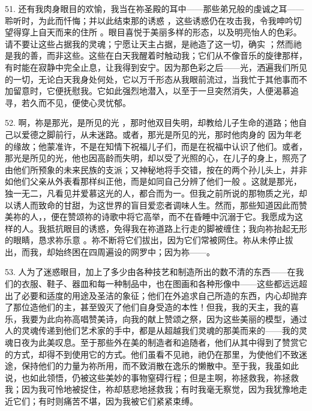 51. 还有我肉身眼目的欢愉，我当在祢圣殿的耳中——那些弟兄般的虔诚之耳——聆听时，为此而忏悔；并以此结束那的诱惑 ，这些诱惑仍在攻击我，令我呻吟切望得穿上自天而来的住所 。眼目喜悦于美丽多样的形态，以及明亮怡人的色彩。请不要让这些占据我的灵魂；宁愿让天主占据，是祂造了这一切，确实 ；然而祂是我的善，而非这些。这些在白天我醒着时触动我；它们从不像音乐的旋律那样，有时能在寂静中完全止息，让我得到安宁。因为那色彩之后——光，洒遍我们所见的一切，无论白天我身处何处，它以万千形态从我眼前流过，当我忙于其他事而不加留意时，它便抚慰我。它如此强烈地潜入，以至于一旦突然消失，人便渴慕追寻，若久而不见，便使心灵忧郁。\par

52. 啊，祢是那光，是所见的光 ，那时他双目失明，却教给儿子生命的道路；他自己以爱德之脚前行，从未迷路。或者，那光是所见的光，那时他肉身的  因为年老的缘故；他蒙准许，不是在知情下祝福儿子们，而是在祝福中认识了他们。或者，那光是所见的光，他也因高龄而失明，却以受了光照的心，在儿子的身上，照亮了由他们所预象的未来民族的支派；又神秘地将手交错，按在的两个孙儿头上，并非如他们父亲从外表看那样纠正他，而是如同自己分辨了他们一般 。这就是那光，独一无二，凡看见并爱慕这光的人，都合而为一。但我之前所说的那物质之光，却以诱人而致命的甘甜，为这世界的盲目爱恋者调味人生。然而，那些知道因此而赞美祢的人，，便在赞颂祢的诗歌中将它高举，而不在昏睡中沉溺于它。我愿成为这样的人。我抵抗眼目的诱惑，免得我在祢道路上行走的脚被缠住；我向祢抬起无形的眼睛，恳求祢乐意 。祢不断将它们拔出，因为它们常被网住。祢从未停止拔出，而我，却始终困在四周遍设的网罗中；因为祢——。\par

53. 人为了迷惑眼目，加上了多少由各种技艺和制造所出的数不清的东西——在我们的衣服、鞋子、器皿和每一种制品中，也在图画和各种形像中——这些都远远超出了必要和适度的用途及圣洁的象征；他们在外追求自己所造的东西，内心却抛弃了那位造他们的主，甚至毁灭了他们自身受造的本性！但我，我的天主，我的喜乐，我要为此向祢高唱赞美诗，向我的献上赞颂之祭，因为这些美丽的模型，通过人的灵魂传递到他们艺术家的手中，都是从超越我们灵魂的那美而来的——我的灵魂日夜为此美叹息。至于那些外在美的制造者和追随者，他们从其中得到了赞赏它的方式，却得不到使用它的方式。他们虽看不见祂，祂仍在那里，为使他们不致迷途，保持他们的力量为祢所用，而不致消散在逸乐的懒散中。至于我，我虽如此说，也如此领悟，仍被这些美妙的事物窒碍行程；但是主啊，祢拯救我，祢拯救我；因为我可怜地被捉住，祢却慈悲地拯救我；有时我毫无察觉，因为我犹豫地走近它们；有时则痛苦不堪，因为我被它们紧紧束缚。\par

